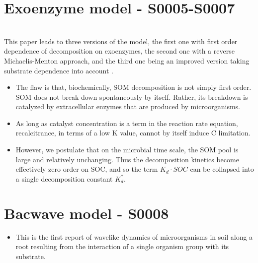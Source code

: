 \documentclass[american, 12pt]{article}
\begin{document}
\section{Exoenzyme model - S0005-S0007}
\citep{Schimel2003SoilBiologyandBiochemistry}\\
This paper leads to three versions of the model, the first one with first order dependence of decomposition on exoenzymes, the second one with a reverse Michaelis-Menton approach, and the third one being an improved version taking substrate dependence into account \citep{Sierra2015EM}.
\begin{itemize}
  \item The flaw is that, biochemically, SOM decomposition is not simply first order. SOM does not break down spontaneously by itself. Rather, its breakdown is catalyzed by extracellular enzymes that are produced by microorganisms.
  \item As long as catalyst concentration is a term in the reaction rate equation, recalcitrance, in terms of a low K value, cannot by itself induce C limitation.
  \item However, we postulate that on the microbial time scale, the SOM pool is large and relatively unchanging. Thus the decomposition kinetics become effectively zero order on SOC, and so the term $K_d\cdot SOC$ can be collapsed into a single decomposition constant $K_d^\ast$.
\end{itemize}

\section{Bacwave model - S0008}
\citep{Zelenev2000MicrobialEcology}
\begin{itemize}
  \item This is the first report of wavelike dynamics of microorganisms in soil along a root resulting from the interaction of a single organism group with its substrate.
\end{itemize}
\end{document}
